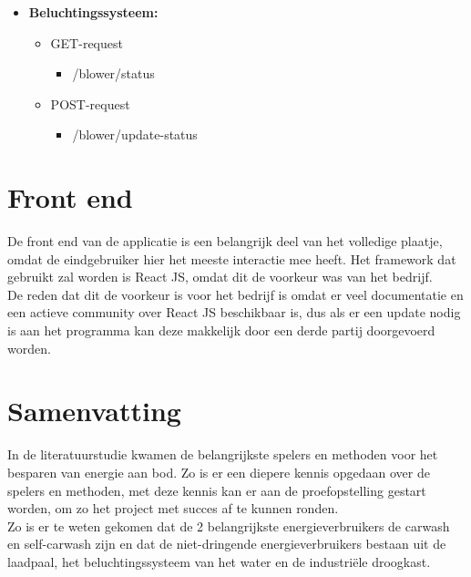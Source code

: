 \begin{itemize}
\begin{itemize}
\begin{itemize}
                    \end{itemize}
          \end{itemize}
    \item \textbf{Beluchtingssysteem:}
          \begin{itemize}
              \item GET-request
                    \begin{itemize}
                        \item /blower/status
                    \end{itemize}
              \item POST-request
                    \begin{itemize}
                        \item /blower/update-status
                    \end{itemize}
          \end{itemize}
\end{itemize}

\section{Front end}
\label{sec:stand-van-zaken-front-end}

De front end van de applicatie is een belangrijk deel van het volledige plaatje, omdat de eindgebruiker hier het meeste interactie mee heeft. Het framework dat gebruikt zal worden is React JS, omdat dit de voorkeur was van het bedrijf.\\

De reden dat dit de voorkeur is voor het bedrijf is omdat er veel documentatie en een actieve community over React JS beschikbaar is, dus als er een update nodig is aan het programma kan deze makkelijk door een derde partij doorgevoerd worden.

\section{Samenvatting}
\label{sec:stand-van-zaken-samenvatting}

In de literatuurstudie kwamen de belangrijkste spelers en methoden voor het besparen van energie aan bod. Zo is er een diepere kennis opgedaan over de spelers en methoden, met deze kennis kan er aan de proefopstelling gestart worden, om zo het project met succes af te kunnen ronden.\\

Zo is er te weten gekomen dat de 2 belangrijkste energieverbruikers de carwash en self-carwash zijn en dat de niet-dringende energieverbruikers bestaan uit de laadpaal, het beluchtingssysteem van het water en de industriële droogkast.\\

